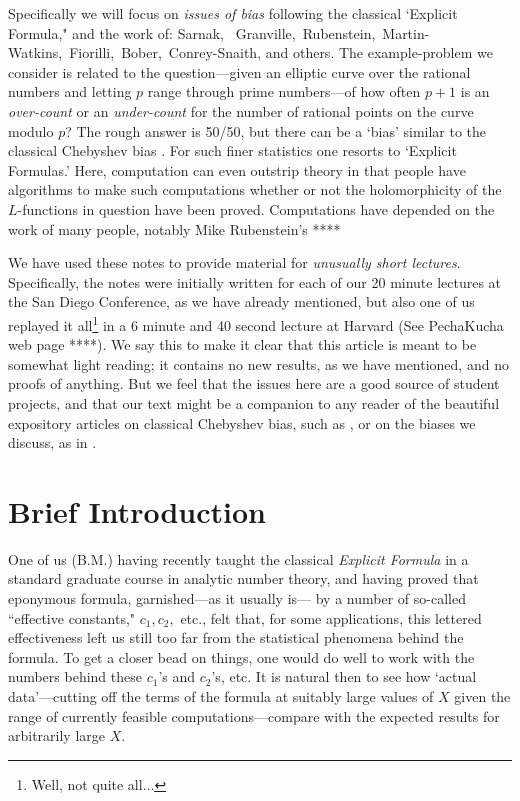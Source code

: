 \documentclass[11pt]{article}
\theoremstyle{plain}
\theoremstyle{definition}
\numberwithin{equation}{section}
\numberwithin{figure}{section}
\numberwithin{table}{section}
\begin{document}
  Specifically we will  focus on {\it issues of bias}  following the classical `Explicit Formula," and the work of:
Sarnak, \ Granville,\  Rubenstein,\, Martin-Watkins,\ Fiorilli,\ Bober,\ Conrey-Snaith, and others.
 The example-problem we consider is related to the question---given an elliptic curve over the rational numbers and letting  $p$ range through prime numbers---of how often  $p+1$ is an {\it over-count} or an {\it under-count} for the number of rational points on the curve modulo $p$? The rough answer is 50/50, but there can be a `bias' similar to the classical Chebyshev bias  \cite{R-S}. For such finer statistics one resorts to `Explicit Formulas.'  Here, computation can even outstrip theory in that people have algorithms to make such computations whether or not the holomorphicity of the $L$-functions in question have been proved. Computations have depended on the work of many people, notably Mike Rubenstein's ****

 We have used these notes to provide material for {\it unusually short lectures}. Specifically, the notes were initially written for each of our 20 minute lectures at the San Diego Conference, as we have already mentioned, but also one of us replayed it all{\footnote{ Well, not quite all$\dots$}} in a 6 minute and 40 second lecture at Harvard (See PechaKucha web page ****). We say this to make it clear that this article is meant to be  somewhat light reading; it contains no new results, as we have mentioned, and no proofs of anything. But we feel that the issues here are a good source of student projects, and that our text might be  a companion to any reader of the beautiful expository articles on classical Chebyshev bias, such as \cite{R-S}, or on the biases we discuss, as in \cite{S}.

\hskip20pt{\small{\tableofcontents}}

\section{Brief Introduction}
 One of us (B.M.) having recently taught the classical {\it Explicit Formula} in a standard graduate course in analytic number theory, and having proved that eponymous formula, garnished---as it usually is--- by a number of so-called ``effective constants," $c_1, c_2,$ etc., felt  that, for some applications, this lettered effectiveness left us still too far from  the statistical phenomena behind the formula. To get a closer bead on things, one would do well to work with the numbers behind these   $c_1$'s and $c_2$'s, etc.  It is natural then to see how `actual data'---cutting off the terms of the formula at suitably large values of $X$ given the range of currently feasible computations---compare with the expected results for arbitrarily large $X$.
\end{document}
